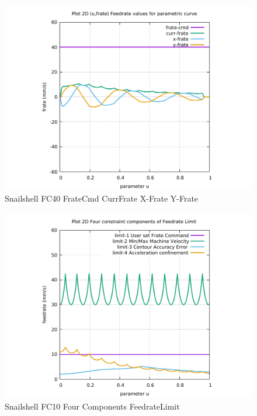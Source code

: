\begin{figure}
	\caption     {Snailshell FC40 FrateCmd CurrFrate X-Frate Y-Frate}
	\label{30-img-Snailshell-FC40-FrateCmd-CurrFrate-X-Frate-Y-Frate.pdf}
	\includegraphics[width=1.00\textwidth]{Chap4/appendix/app-Snailshell/plots/30-img-Snailshell-FC40-FrateCmd-CurrFrate-X-Frate-Y-Frate.pdf}
\end{figure}


\clearpage
\pagebreak

\begin{figure}
	\caption     {Snailshell FC10 Four Components FeedrateLimit}
	\label{31-img-Snailshell-FC10-Four-Components-FeedrateLimit.pdf}
	\includegraphics[width=1.00\textwidth]{Chap4/appendix/app-Snailshell/plots/31-img-Snailshell-FC10-Four-Components-FeedrateLimit.pdf}
\end{figure}


